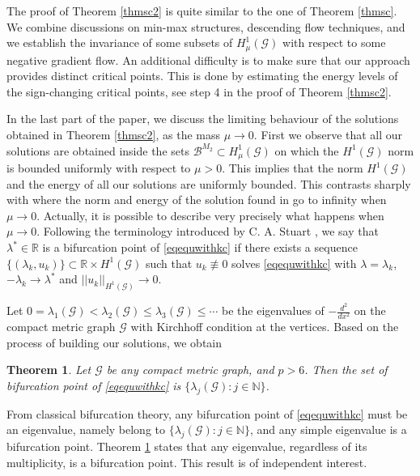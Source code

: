 \documentclass[10pt,a4paper]{article}
\newtheorem{theorem}{Theorem}[section]
\newtheorem{remark}[theorem]{Remark}
\theoremstyle{definition} \theoremstyle{remark}
\numberwithin{equation}{section}
\newcommand{\G}{\mathcal{G}}
\newcommand{\R}{\mathbb{R}}
\newcommand{\N}{\mathbb{N}}
\newcommand{\B}{\mathcal{B}}
\newcommand{\la}{\lambda}
\begin{document}

The proof of Theorem \ref{thmsc2} is quite similar to the one of Theorem \ref{thmsc}. We combine discussions on min-max structures, descending flow techniques, and  we establish the invariance of some subsets of $H^1_\mu(\G)$ with respect to some negative gradient flow. An additional difficulty is to make sure that our approach provides distinct critical points. This is done by estimating the energy levels of the sign-changing critical points, see step 4 in the proof of Theorem \ref{thmsc2}.
\smallskip

In the last part of the paper, we discuss the limiting behaviour of the solutions obtained in Theorem \ref{thmsc2}, as the mass $\mu \to 0$.  First we observe that all our solutions are obtained inside the sets $\B^{M_2} \subset H^1_{\mu}(\G)$ on which the $H^1(\G)$ norm is bounded uniformly with respect to $\mu >0$. This implies that the norm $H^1(\G)$ and the energy of all our solutions are uniformly bounded. This contrasts sharply with \cite{CJS} where the norm and energy of the solution found in \cite[Theorem 1.1]{CJS} go to infinity when $\mu \to 0$. Actually, it is possible to describe very precisely what happens when $\mu \to 0$.  Following the terminology introduced by C. A. Stuart \cite{St1,St2}, we say that $\lambda^* \in \R$ is a bifurcation point 
of \eqref{eqequwithkc} if there exists a sequence $\{ (\lambda_k, u_k) \} \subset \R \times H^1(\G)$ such that $u_k \not \equiv 0$ solves \eqref{eqequwithkc} with $\lambda = \lambda_k$, $-\lambda_k \to \lambda^*$  and $||u_k||_{H^1(\G)} \to 0$. 	
\smallskip

Let $0=\la_1(\G) < \la_2(\G) \leq \la_3(\G) \leq \cdots $ be the eigenvalues of $-\frac{d^2}{dx^2}$ on the compact metric graph $\G$ with Kirchhoff condition at the vertices.
Based on the process of building our solutions, we obtain

\begin{theorem} \label{thmsc3}
Let  $\G$ be any compact metric graph, and $p > 6$. Then the set of bifurcation point of \eqref{eqequwithkc} is $\{\la_j(\G): j \in \N \}$.
\end{theorem}
From classical bifurcation theory, any bifurcation point of \eqref{eqequwithkc} must be an eigenvalue, namely belong to $\{\la_j(\G): j \in \N \}$, and any simple eigenvalue is a bifurcation point. Theorem \ref{thmsc3} states that any eigenvalue, regardless of its multiplicity, is a bifurcation point. This result is of independent interest. \smallskip
\end{document}
